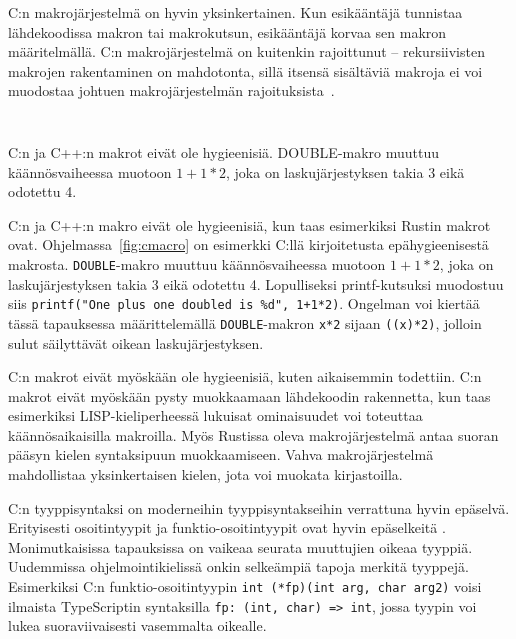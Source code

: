 C:n makrojärjestelmä on hyvin yksinkertainen. Kun esikääntäjä tunnistaa
lähdekoodissa makron tai makrokutsun, esikääntäjä korvaa sen makron
määritelmällä. C:n makrojärjestelmä on kuitenkin rajoittunut -- rekursiivisten
makrojen rakentaminen on mahdotonta, sillä itsensä sisältäviä makroja ei voi
muodostaa johtuen makrojärjestelmän rajoituksista~\citep[luku 6.10.3.4]{C18}.

\FloatBarrier

\begin{listing}[ht!]
    \inputminted{C}{c-hygiene.c}
    \inputminted{text}{c-hygiene-output.txt}
    \caption{C:n ja C++:n makrot eivät ole hygieenisiä. DOUBLE-makro muuttuu
    käännösvaiheessa muotoon $1+1*2$, joka on laskujärjestyksen takia 3 eikä
    odotettu 4.}
    \label{fig:cmacro}
\end{listing}

\FloatBarrier

C:n ja C++:n makro eivät ole hygieenisiä, kun taas esimerkiksi Rustin makrot
ovat. Ohjelmassa~\ref{fig:cmacro} on esimerkki C:llä kirjoitetusta
epähygieenisestä makrosta. \texttt{DOUBLE}-makro muuttuu käännösvaiheessa
muotoon $1+1*2$, joka on laskujärjestyksen takia 3 eikä odotettu 4.
Lopulliseksi printf-kutsuksi muodostuu siis \texttt{printf("One plus one
doubled is \%d", 1+1*2)}. Ongelman voi kiertää tässä tapauksessa
määrittelemällä \texttt{DOUBLE}-makron \texttt{x*2} sijaan \texttt{((x)*2)},
jolloin sulut säilyttävät oikean laskujärjestyksen.

C:n makrot eivät myöskään ole hygieenisiä, kuten aikaisemmin todettiin. C:n
makrot eivät myöskään pysty muokkaamaan lähdekoodin rakennetta, kun taas
esimerkiksi LISP-kieliperheessä lukuisat ominaisuudet voi toteuttaa
käännösaikaisilla makroilla. Myös Rustissa oleva makrojärjestelmä antaa suoran
pääsyn kielen syntaksipuun muokkaamiseen. Vahva makrojärjestelmä mahdollistaa
yksinkertaisen kielen, jota voi muokata kirjastoilla.

C:n tyyppisyntaksi on moderneihin tyyppisyntakseihin verrattuna hyvin epäselvä.
Erityisesti osoitintyypit ja funktio-osoitintyypit ovat hyvin epäselkeitä%
. Monimutkaisissa tapauksissa on vaikeaa seurata muuttujien oikeaa tyyppiä.
Uudemmissa ohjelmointikielissä onkin selkeämpiä tapoja merkitä tyyppejä.
Esimerkiksi C:n funktio-osoitintyypin \texttt{int~(*fp)(int~arg,~char~arg2)}
voisi ilmaista TypeScriptin syntaksilla \texttt{fp:~(int,~char)~=>~int}, jossa
tyypin voi lukea suoraviivaisesti vasemmalta oikealle.

